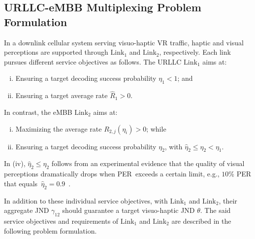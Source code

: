 \documentclass[conference]{IEEEtran}
\def\R{{\hat{R}_1}}
\def\L{\text{Link}}
\begin{document}
\subsection{URLLC-eMBB Multiplexing Problem Formulation} \label{Sect:Sys_Problem}
In a downlink cellular system serving visuo-haptic VR traffic, haptic and visual perceptions are supported through $\L_1$ and $\L_2$, respectively. Each link pursues different service objectives as follows. The URLLC $\L_1$ aims at:
\begin{enumerate}[(i)]
\item Ensuring a target decoding success probability $\eta_1<1$; and
\item Ensuring a target average rate $\R > 0$.
\end{enumerate}
In contrast, the eMBB $\L_2$ aims at:
\begin{enumerate}[(i)]\addtocounter{enumi}{2}
\item Maximizing the average rate $R_{2,j}(\eta_i) > 0$; while
\item Ensuring a target decoding success probability $\eta_2$, with $\hat{\eta}_2 \leq \eta_2<\eta_1$.
\end{enumerate}
In (iv), $\hat{\eta}_2\leq \eta_2$ follows from an experimental evidence that the quality of visual perceptions dramatically drops when PER~exceeds a certain limit, e.g., $10$\% PER that equals~$\hat{\eta}_2 = 0.9$~\cite{Shi:10}.

In addition to these individual service objectives, with $\L_1$ and $\L_2$, their aggregate JND $\gamma_{12}$ should guarantee a target visuo-haptic JND $\theta$. The said service objectives and requirements of $\L_1$ and $\L_2$ are described in the following problem formulation.
\end{document}
